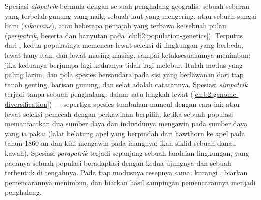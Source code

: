 \begin{proposition}\label{prop:b2:speciation:modes}
%
Spesiasi \emph{alopatrik} bermula dengan sebuah penghalang geografis:
sebuah sebaran yang terbelah gunung yang naik, sebuah laut yang
mengering, atau sebuah sungai baru (\emph{vikarians}), atau beberapa
penjajah yang terbawa ke sebuah pulau (\emph{peripatrik}, beserta  dan hanyutan pada \cref{ch:b2:population-genetics}). Terputus
dari , kedua populasinya memencar lewat seleksi di
lingkungan yang berbeda, lewat hanyutan, dan lewat 
masing-masing, sampai ketaksesuaiannya menimbun; jika keduanya berjumpa
lagi keduanya tidak lagi melebur. Itulah modus yang paling lazim, dan
pola spesies bersaudara pada sisi yang berlawanan dari tiap tanah
genting, barisan gunung, dan selat adalah catatannya. Spesiasi
\emph{simpatrik} terjadi tanpa sebuah penghalang: dalam satu langkah
lewat  (\cref{ch:b2:genome-diversification}) --- sepertiga
spesies tumbuhan muncul dengan cara ini; atau lewat seleksi pemecah
dengan perkawinan berpilih, ketika sebuah populasi memanfaatkan dua
sumber daya dan individunya mengawin pada sumber daya yang ia pakai
(lalat belatung apel yang berpindah dari hawthorn ke apel pada tahun
1860-an dan kini mengawin pada inangnya; ikan siklid sebuah danau
kawah). Spesiasi \emph{parapatrik} terjadi sepanjang sebuah landaian
lingkungan, yang padanya sebuah populasi beradaptasi dengan kedua
ujungnya dan sebuah  terbentuk di tengahnya. Pada tiap
modusnya resepnya sama: kurangi , biarkan pemencarannya
menimbun, dan biarkan hasil sampingan pemencarannya menjadi penghalang.
\end{proposition}

